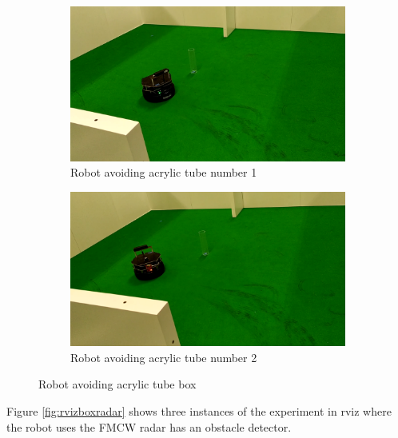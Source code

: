 \begin{figure}[ht!]
  \centering
  \begin{subfigure}[b]{0.49\linewidth}
    \includegraphics[width=\linewidth]{imgs/chapter5/glassRS1.png}
     \caption{Robot avoiding acrylic tube number 1}
     \label{fig::glassRS1}
  \end{subfigure}
  \begin{subfigure}[b]{0.49\linewidth}
    \includegraphics[width=\linewidth]{imgs/chapter5/glassRS2.png}
    \caption{Robot avoiding acrylic tube  number 2}
    \label{fig::glassRS2}
  \end{subfigure}
  \caption{Robot avoiding acrylic tube box}
  \label{fig:glassRS}
\end{figure}

Figure \ref{fig:rvizboxradar} shows three instances of the experiment in rviz where the robot uses the \ac{FMCW} \ac{radar} has an obstacle detector.

